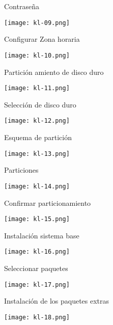 \begin{frame}[c]{Contraseña}
  \begin{center}
    \texttt{[image: kl-09.png]}
  \end{center}
\end{frame}

\begin{frame}[c]{Configurar Zona horaria}
  \begin{center}
    \texttt{[image: kl-10.png]}
  \end{center}
\end{frame}

\begin{frame}[c]{Partición amiento de disco duro}
  \begin{center}
    \texttt{[image: kl-11.png]}
  \end{center}
\end{frame}

\begin{frame}[c]{Selección de disco duro}
  \begin{center}
    \texttt{[image: kl-12.png]}
  \end{center}
\end{frame}

\begin{frame}[c]{Esquema de partición}
  \begin{center}
    \texttt{[image: kl-13.png]}
  \end{center}
\end{frame}

\begin{frame}[c]{Particiones}
  \begin{center}
    \texttt{[image: kl-14.png]}
  \end{center}
\end{frame}

\begin{frame}[c]{Confirmar particionamiento}
  \begin{center}
    \texttt{[image: kl-15.png]}
  \end{center}
\end{frame}

\begin{frame}[c]{Instalación sistema base}
  \begin{center}
    \texttt{[image: kl-16.png]}
  \end{center}
\end{frame}

\begin{frame}[c]{Seleccionar paquetes}
  \begin{center}
    \texttt{[image: kl-17.png]}
  \end{center}
\end{frame}

\begin{frame}[c]{Instalación de los paquetes extras}
  \begin{center}
    \texttt{[image: kl-18.png]}
  \end{center}
\end{frame}

